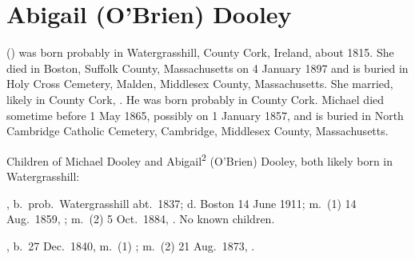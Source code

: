 \section{Abigail (O'Brien) Dooley}

 () was born probably in Watergrasshill, County Cork, Ireland, about 1815.\cite{Census1855Abigail} She died in Boston, Suffolk County, Massachusetts on 4 January 1897\cite{Abigail2OBrienDeath} and is buried in Holy Cross Cemetery, Malden, Middlesex County, Massachusetts.\cite{CarolGordon} She married, likely in County Cork, .\cite{Abigail2OBrienDeath} He was born probably in County Cork.\cite{MichaelDooleyBirth} Michael died sometime before 1 May 1865,\cite{Census1865Abigail} possibly on 1 January 1857,\cite{MichaelDooleyDeath} and is buried in North Cambridge Catholic Cemetery, Cambridge, Middlesex County, Massachusetts.\cite{DianaBerberenaLetter2}

\begin{KidsIntro}
	Children of Michael Dooley and Abigail\textsuperscript{2} (O'Brien) Dooley, both likely born in Watergrasshill:
\end{KidsIntro}

\begin{Kids}
	, b.\ prob.\ Watergrasshill abt.\ 1837;\cite{Census1855Hannah3Dooley} d. Boston 14 June 1911;\cite{Hannah3DooleyDeath} m.\ (1) 14 Aug.\ 1859, ;\cite{JeremiahCooneyMarriage} m.\ (2) 5 Oct.\ 1884, .\cite{MichaelCusickMarriage} No known children.
	
	, b.\ 27 Dec.\ 1840, m.\ (1) ; m.\ (2) 21 Aug.\ 1873, .
\end{Kids}
